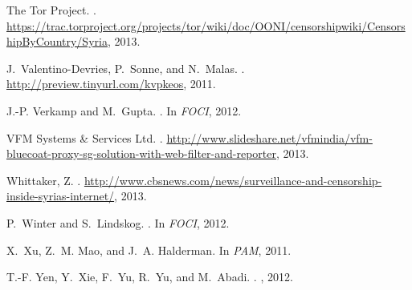 \documentclass{sig-alternate-2013}
\begin{document}
\begin{thebibliography}{10}
{The Tor Project}.
.
\newblock
  \url{https://trac.torproject.org/projects/tor/wiki/doc/OONI/censorshipwiki/CensorshipByCountry/Syria},
  2013.

J.~Valentino-Devries, P.~Sonne, and N.~Malas.
.
\newblock \url{http://preview.tinyurl.com/kvpkeos}, 2011.

J.-P. Verkamp and M.~Gupta.
.
\newblock In {\em FOCI}, 2012.

{VFM Systems \& Services Ltd.}
.
\newblock
  \url{http://www.slideshare.net/vfmindia/vfm-bluecoat-proxy-sg-solution-with-web-filter-and-reporter},
  2013.

{Whittaker, Z.}
.
\newblock
  \url{http://www.cbsnews.com/news/surveillance-and-censorship-inside-syrias-internet/},
  2013.

P.~Winter and S.~Lindskog.
.
\newblock In {\em FOCI}, 2012.

X.~Xu, Z.~M. Mao, and J.~A. Halderman.
\newblock In {\em PAM}, 2011.

T.-F. Yen, Y.~Xie, F.~Yu, R.~Yu, and M.~Abadi.
.
, 2012.

\end{thebibliography}
 
\end{document}
